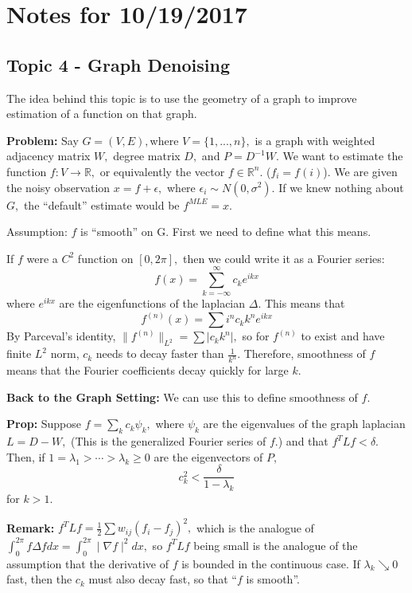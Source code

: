 \documentclass[english]{article}
\begin{document}
\section*{Notes for 10/19/2017 }

\subsection*{Topic 4 - Graph Denoising}

The idea behind this topic is to use the geometry of a graph to improve
estimation of a function on that graph. 

\textbf{Problem:} Say $G=(V,E),$where $V=\{1,...,n\},$ is a graph
with weighted adjacency matrix $W,$ degree matrix $D,$ and $P=D^{-1}W.$
We want to estimate the function $f:V\rightarrow\mathbb{R},$ or equivalently
the vector $f\in\mathbb{R}^{n}.$ ($f_{i}=f(i)$). We are given the
noisy observation $x=f+\epsilon,$ where $\epsilon_{i}\sim N(0,\sigma^{2}).$
If we knew nothing about $G,$ the ``default'' estimate would be
$f^{MLE}=x.$ 

Assumption: $f$ is ``smooth'' on G. First we need to define what
this means. 

If $f$ were a $C^{2}$ function on $[0,2\pi],$ then we could write
it as a Fourier series: 
\[
f(x)=\sum_{k=-\infty}^{\infty}c_{k}e^{ikx}
\]
 where $e^{ikx}$ are the eigenfunctions of the laplacian $\Delta.$
This means that 
\[
f^{(n)}(x)=\sum i^{n}c_{k}k^{n}e^{ikx}
\]
 By Parceval's identity, $\parallel f^{(n)}\parallel_{L^{2}}=\sum\mid c_{k}k^{n}\mid,$
so for $f^{(n)}$ to exist and have finite $L^{2}$ norm, $c_{k}$
needs to decay faster than $\frac{1}{k^{n}}.$ Therefore, smoothness
of $f$ means that the Fourier coefficients decay quickly for large
$k.$ 

\textbf{Back to the Graph Setting:} We can use this to define smoothness
of $f.$ 

\textbf{Prop: }Suppose $f=\sum_{k}c_{k}\psi_{k},$ where $\psi_{k}$
are the eigenvalues of the graph laplacian $L=D-W,$ (This is the
generalized Fourier series of $f.$) and that $f^{T}Lf<\delta.$ Then,
if $1=\lambda_{1}>\cdots>\lambda_{k}\geq0$ are the eigenvectors of
$P,$ 
\[
c_{k}^{2}<\frac{\delta}{1-\lambda_{k}}
\]
 for $k>1.$ 

\textbf{Remark:} $f^{T}Lf=\frac{1}{2}\sum w_{ij}(f_{i}-f_{j})^{2},$
which is the analogue of $\int_{0}^{2\pi}f\Delta fdx=\int_{0}^{2\pi}\mid\nabla f\mid^{2}dx,$
so $f^{T}Lf$ being small is the analogue of the assumption that the
derivative of $f$ is bounded in the continuous case. If $\lambda_{k}\searrow0$
fast, then the $c_{k}$ must also decay fast, so that ``$f$ is smooth''. 
\end{document}
